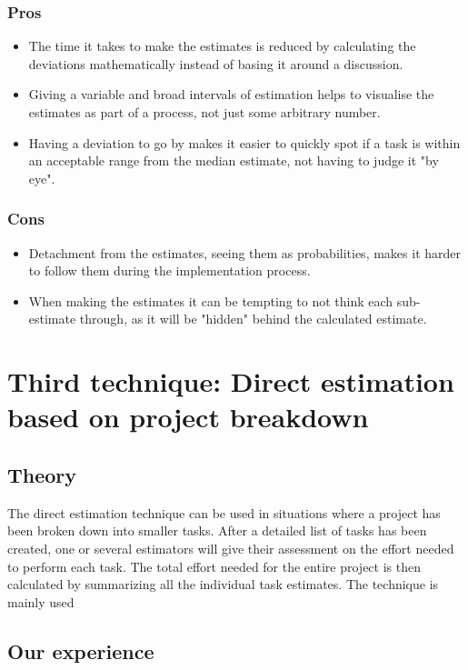 \subsubsection{Pros}
\begin{itemize}
\item The time it takes to make the estimates is reduced by calculating the deviations mathematically instead of basing it around a discussion.
\item Giving a variable and broad intervals of estimation helps to visualise the estimates as part of a process, not just some arbitrary number.
\item Having a deviation to go by makes it easier to quickly spot if a task is within an acceptable range from the median estimate, not having to judge it "by eye".

\end{itemize}

\subsubsection{Cons}
\begin{itemize}
\item Detachment from the estimates, seeing them as probabilities, makes it harder to follow them during the implementation process.
\item When making the estimates it can be tempting to not think each sub-estimate through, as it will be "hidden" behind the calculated estimate.

\end{itemize}

\section{Third technique: Direct estimation based on project breakdown}
\subsection{Theory}
The direct estimation technique can be used in situations where a project has been broken down into smaller tasks. After a detailed list of tasks has been created, one or several estimators will give their assessment on the effort needed to perform each task. The total effort needed for the entire project is then calculated by summarizing all the individual task estimates.
The technique is mainly used 

\subsection{Our experience}


